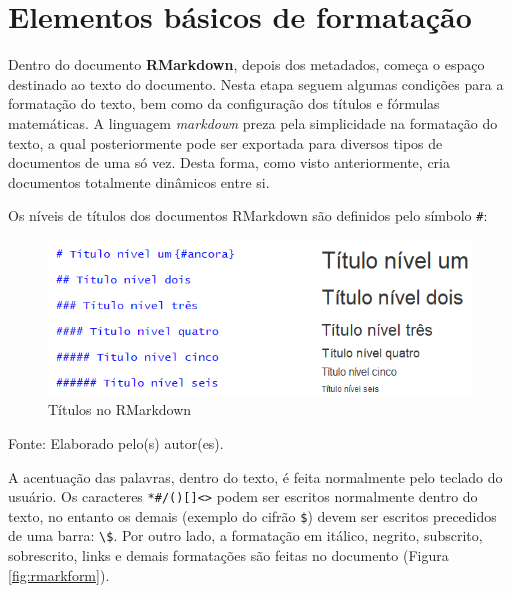 \documentclass[12pt,brazil,oneside]{book}
\begin{document}
\hypertarget{elementos-basicos-de-formatacao}{%
\section{Elementos básicos de
formatação}\label{elementos-basicos-de-formatacao}}

Dentro do documento \textbf{RMarkdown}, depois dos metadados, começa o
espaço destinado ao texto do documento. Nesta etapa seguem algumas
condições para a formatação do texto, bem como da configuração dos
títulos e fórmulas matemáticas. A linguagem \emph{markdown} preza pela
simplicidade na formatação do texto, a qual posteriormente pode ser
exportada para diversos tipos de documentos de uma só vez. Desta forma,
como visto anteriormente, cria documentos totalmente dinâmicos entre si.

Os níveis de títulos dos documentos RMarkdown são definidos pelo símbolo
\texttt{\#}:

\begin{figure}[H]

{\centering \includegraphics[width=0.8\linewidth]{rmarktit} 

}

\caption{Títulos no RMarkdown}\label{fig:rmarktit}
\end{figure}

Fonte: Elaborado pelo(s) autor(es).

A acentuação das palavras, dentro do texto, é feita normalmente pelo
teclado do usuário. Os caracteres
\texttt{*\#/(){[}{]}\textless{}\textgreater{}} podem ser escritos
normalmente dentro do texto, no entanto os demais (exemplo do cifrão
\texttt{\$}) devem ser escritos precedidos de uma barra:
\texttt{\textbackslash{}\$}. Por outro lado, a formatação em itálico,
negrito, subscrito, sobrescrito, links e demais formatações são feitas
no documento (Figura \ref{fig:rmarkform}).
\end{document}
